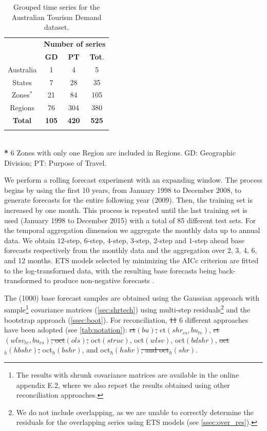 \documentclass[review, 11pt]{elsarticle}
\theoremstyle{definition}
\begin{document}
\begin{table}[!t]
	\setlength{\tabcolsep}{10pt}
	\centering
	\begin{tabular}{c|cc|c}
		\toprule
		& \multicolumn{3}{c}{\textbf{Number of series}}\\
		& \textbf{GD} & \textbf{PT} & \textbf{Tot}. \\
		\midrule
		Australia & 1 & 4 & 5 \\
		States & 7 & 28 & 35 \\
		Zones$^*$ & 21 & 84 & 105 \\
		Regions & 76 & 304 & 380 \\
		\bottomrule
		\textbf{Total} & \textbf{105}                                  & \textbf{420}   & \textbf{525} \\
		\bottomrule
		\addlinespace[0.3em]
	\end{tabular}\\
	{\footnotesize \textbf{*} 6 Zones with only one Region are included in Regions. GD: Geographic Division; PT: Purpose of Travel.}\\[0.1cm]
	\caption{\label{tab:nseries} Grouped time series for the Australian Tourism Demand dataset. }
	\vspace*{-0.5\baselineskip}
\end{table}

We perform a rolling forecast experiment with an expanding window. The process begins by using the first 10 years, from January 1998 to December 2008, to generate forecasts for the entire following year (2009). Then, the training set is increased by one month. This process is repeated until the last training set is used (January 1998 to December 2015) with a total of 85 different test sets. For the temporal aggregation dimension we aggregate the monthly data up to annual data. We obtain $12$-step, $6$-step, $4$-step, $3$-step, $2$-step and $1$-step ahead base forecasts respectively from the monthly data and the aggregation over 2, 3, 4, 6, and 12 months. ETS models selected by minimizing the AICc criterion \citep{Rforecast} %
are fitted to the log-transformed data, with the resulting base forecasts being back-transformed to produce non-negative forecasts \citep{wickramasuriya2020}.

The (1000) base forecast samples are obtained using the Gaussian approach with sample\footnote{The results with shrunk covariance matrices are available in the online appendix E.2, {\color{blue}where we also report the results obtained using other reconciliation approaches.}} covariance matrices (\autoref{sec:shrtech}) using multi-step residuals\footnote{We do not include overlapping, as we are unable to correctly determine the residuals for the overlapping series using ETS models (see \autoref{ssec:over_res}).} and the bootstrap approach (\autoref{ssec:boot}). For reconciliation, {\color{red}\sout{11}} {\color{blue}6} different approaches have been adopted (see \autoref{tab:notation}): {\color{red}\sout{ct$(bu)$,}} ct$(shr_{cs}, bu_{te})$, {\color{red}\sout{ct$(wlsv_{te}, bu_{cs})$, oct$(ols)$,}} oct$(struc)$, oct$(wlsv)$, oct$(bdshr)$, {\color{red}\sout{oct$_h(hbshr)$,}} oct$_h(bshr)$, {\color{blue}and} oct$_h(hshr)${\color{red}\sout{, and oct$_h(shr)$}}.
\end{document}
